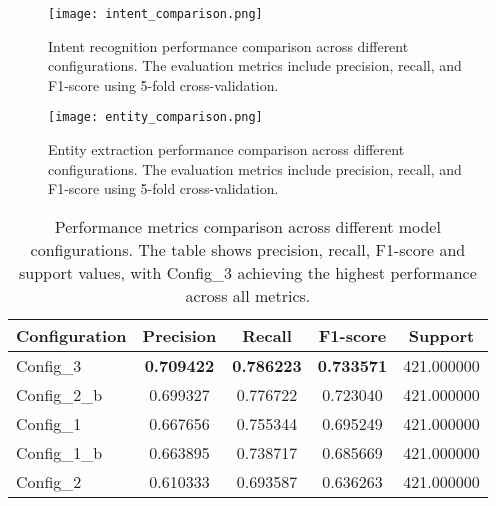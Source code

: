 \begin{figure}[H]
\centering
\texttt{[image: intent\_comparison.png]}
\caption{Intent recognition performance comparison across different configurations. The evaluation metrics include precision, recall, and F1-score using 5-fold cross-validation.}
\label{fig:intent_comparison}
\end{figure}

\begin{figure}[H]
\centering
\texttt{[image: entity\_comparison.png]}
\caption{Entity extraction performance comparison across different configurations. The evaluation metrics include precision, recall, and F1-score using 5-fold cross-validation.}
\label{fig:entity_comparison}
\end{figure}

\begin{table}[H]
\caption{Performance metrics comparison across different model configurations. The table shows precision, recall, F1-score and support values, with Config\_3 achieving the highest performance across all metrics.}
\label{tab:performance_metrics}
\centering
\begin{tabular}{lcccc}
\toprule
\textbf{Configuration} & \textbf{Precision} & \textbf{Recall} & \textbf{F1-score} & \textbf{Support} \\
\midrule
Config\_3 & \textbf{0.709422} & \textbf{0.786223} & \textbf{0.733571} & 421.000000 \\
Config\_2\_b & 0.699327 & 0.776722 & 0.723040 & 421.000000 \\
Config\_1 & 0.667656 & 0.755344 & 0.695249 & 421.000000 \\
Config\_1\_b & 0.663895 & 0.738717 & 0.685669 & 421.000000 \\
Config\_2 & 0.610333 & 0.693587 & 0.636263 & 421.000000 \\
\bottomrule
\end{tabular}
\end{table}

